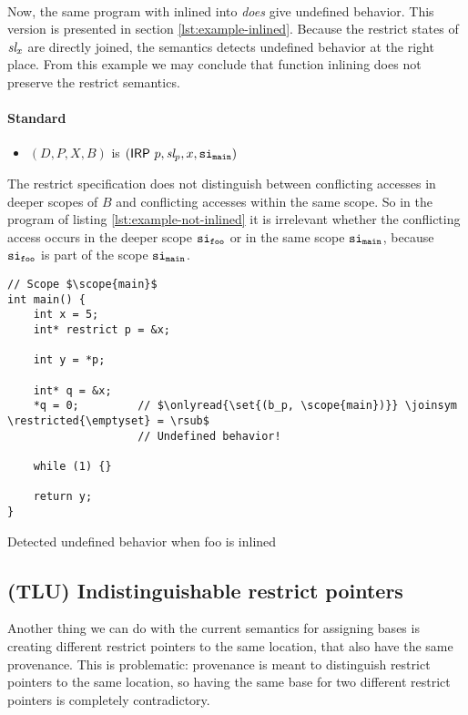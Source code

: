 \leavevmode
\\
Now, the same program with  inlined into  \textit{does} give undefined behavior.
This version is presented in section \ref{lst:example-inlined}.
Because the restrict states of $\textit{sl}_x$ are directly joined, the semantics detects undefined behavior at the right place.
From this example we may conclude that function inlining does not preserve the restrict semantics.

\newpage

\paragraph{Standard}
\begin{itemize}
    \itemsep0em
    \item $(D, P, X, B)$ is $(\mathsf{IRP} \ p, \textit{sl}_p, x, \mathtt{si}_\mathtt{main})$
\end{itemize}

The restrict specification does not distinguish between conflicting accesses in deeper scopes
of $B$ and conflicting accesses within the same scope.
So in the program of listing \ref{lst:example-not-inlined} it is irrelevant whether the conflicting access occurs in the deeper scope 
$\mathtt{si}_\mathtt{foo}$ or in the same scope $\mathtt{si}_\mathtt{main}$, because $\mathtt{si}_\mathtt{foo}$ is part of the scope $\mathtt{si}_\mathtt{main}$.


\begin{code}
\begin{verbatim}
// Scope $\scope{main}$
int main() {
    int x = 5;
    int* restrict p = &x;

    int y = *p;

    int* q = &x;
    *q = 0;         // $\onlyread{\set{(b_p, \scope{main})}} \joinsym \restricted{\emptyset} = \rsub$
                    // Undefined behavior! 

    while (1) {}

    return y;
}
\end{verbatim}
\vspace*{-0.3cm}
\caption{Detected undefined behavior when foo is inlined}
\label{lst:example-inlined}
\end{code}

\subsection{(TLU) Indistinguishable restrict pointers}\label{subsec:indistinguishable-restrict-pointers}
Another thing we can do with the current semantics for assigning bases is creating different restrict pointers
to the same location, that also have the same provenance.
This is problematic: provenance is meant to distinguish restrict pointers to the same location, so having the same base for two different restrict pointers
is completely contradictory.


